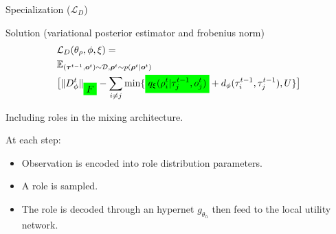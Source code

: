\documentclass{beamer}
\newcommand{\mathcolorbox}[2]{\colorbox{#1}{$\displaystyle #2$}}
\begin{document}
    \begin{frame}{Specialization ($\mathcal{L}_{D}$)}
        \begin{exampleblock}{Solution (variational posterior estimator and frobenius norm)}
            \begin{align*}
                &\mathcal{L}_D(\theta_\rho, \phi, \xi) =
                \\ &\mathbb{E}_{(\bm{\tau}^{t-1}, \bm{o}^t)\sim\mathcal{D}, \bm{\rho}^t\sim p(\bm{\rho}^t | \bm{o}^t)}
                \\ &\big[\|D_\phi^t\|_{\mathcolorbox{green}{F}} - \sum_{i\ne j}\min\{\mathcolorbox{green}{q_\xi(\rho^{t}_i| \tau^{t-1}_j, o^t_j)} + d_\phi(\tau^{t-1}_i, \tau^{t-1}_j), U\}\big]
            \end{align*}
        \end{exampleblock}

    \end{frame}


    \begin{frame}{Including roles in the mixing architecture.}

        At each step:
        \begin{itemize}
            \pause\item Observation is encoded into role distribution parameters.
            \pause\item A role is sampled.
            \pause\item The role is decoded through an hypernet $g_{\theta_h}$ then feed to the local utility network.
        \end{itemize}

    \end{frame}

\end{document}
